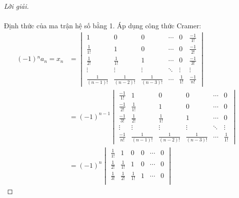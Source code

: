 \documentclass[class=nhvh-linear-algebra,crop=false]{standalone}
\begin{document}
\begin{proof}[Lời giải]
\begin{align*}
    \end{align*}
    \par Định thức của ma trận hệ số bằng 1. Áp dụng công thức Cramer:
    \begin{align*}
        (-1){}^{n}a_{n} = x_{n}   & =
        \begin{vmatrix}
            1                & 0                & 0                & \cdots & 0            & \frac{-1}{1!} \\
            \frac{1}{1!}     & 1                & 0                & \cdots & 0            & \frac{-1}{2!} \\
            \frac{1}{2!}     & \frac{1}{1!}     & 1                & \cdots & 0            & \frac{-1}{3!} \\
            \vdots           & \vdots           & \vdots           & \ddots & \vdots       & \vdots        \\
            \frac{1}{(n-1)!} & \frac{1}{(n-2)!} & \frac{1}{(n-3)!} & \cdots & \frac{1}{1!} & \frac{-1}{n!}
        \end{vmatrix} \\
                                  & = {(-1)}^{n-1}
        \begin{vmatrix}
            \frac{-1}{1!} & 1                & 0                & 0                & \cdots & 0            \\
            \frac{-1}{2!} & \frac{1}{1!}     & 1                & 0                & \cdots & 0            \\
            \frac{-1}{3!} & \frac{1}{2!}     & \frac{1}{1!}     & 1                & \cdots & 0            \\
            \vdots        & \vdots           & \vdots           & \vdots           & \ddots & \vdots       \\
            \frac{-1}{n!} & \frac{1}{(n-1)!} & \frac{1}{(n-2)!} & \frac{1}{(n-3)!} & \cdots & \frac{1}{1!}
        \end{vmatrix} \\
                                  & = {(-1)}^{n}
        \begin{vmatrix}
            \frac{1}{1!} & 1                & 0                & 0                & \cdots & 0            \\
            \frac{1}{2!} & \frac{1}{1!}     & 1                & 0                & \cdots & 0            \\
            \frac{1}{3!} & \frac{1}{2!}     & \frac{1}{1!}     & 1                & \cdots & 0            \\

\end{vmatrix}
\end{align*}
\end{proof}
\end{document}
